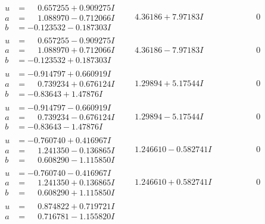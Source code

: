 \documentclass[1p]{elsarticle_modified}
\theoremstyle{definition}
\begin{document}
$$\begin{array}{c|c|c}
 \hline 
\begin{aligned}
u &= \phantom{-}0.657255 + 0.909275 I \\
a &= \phantom{-}1.088970 - 0.712066 I \\
b &= -0.123532 - 0.187303 I\end{aligned}
 & \phantom{-}4.36186 + 7.97183 I & \phantom{-0.000000 } 0 \\ \hline\begin{aligned}
u &= \phantom{-}0.657255 - 0.909275 I \\
a &= \phantom{-}1.088970 + 0.712066 I \\
b &= -0.123532 + 0.187303 I\end{aligned}
 & \phantom{-}4.36186 - 7.97183 I & \phantom{-0.000000 } 0 \\ \hline\begin{aligned}
u &= -0.914797 + 0.660919 I \\
a &= \phantom{-}0.739234 + 0.676124 I \\
b &= -0.83643 + 1.47876 I\end{aligned}
 & \phantom{-}1.29894 + 5.17544 I & \phantom{-0.000000 } 0 \\ \hline\begin{aligned}
u &= -0.914797 - 0.660919 I \\
a &= \phantom{-}0.739234 - 0.676124 I \\
b &= -0.83643 - 1.47876 I\end{aligned}
 & \phantom{-}1.29894 - 5.17544 I & \phantom{-0.000000 } 0 \\ \hline\begin{aligned}
u &= -0.760740 + 0.416967 I \\
a &= \phantom{-}1.241350 - 0.136865 I \\
b &= \phantom{-}0.608290 - 1.115850 I\end{aligned}
 & \phantom{-}1.246610 - 0.582741 I & \phantom{-0.000000 } 0 \\ \hline\begin{aligned}
u &= -0.760740 - 0.416967 I \\
a &= \phantom{-}1.241350 + 0.136865 I \\
b &= \phantom{-}0.608290 + 1.115850 I\end{aligned}
 & \phantom{-}1.246610 + 0.582741 I & \phantom{-0.000000 } 0 \\ \hline\begin{aligned}
u &= \phantom{-}0.874822 + 0.719721 I \\
a &= \phantom{-}0.716781 - 1.155820 I \\

\end{aligned}
\end{array}$$
\end{document}
